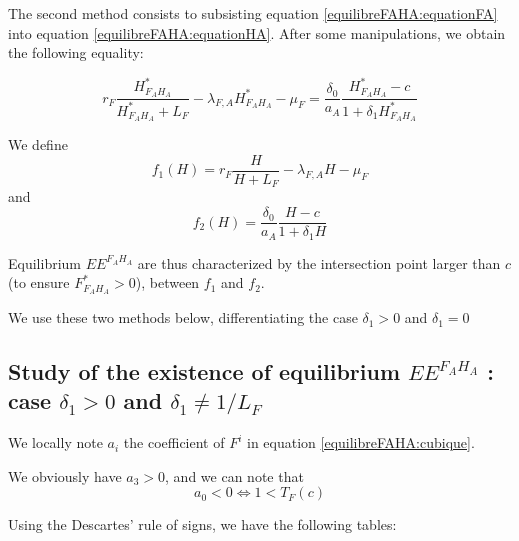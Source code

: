 \documentclass{article}
\newcommand{\lfa}{\lambda_{F, A}}
\begin{document}
\begin{appendices}
\medskip
The second method consists to subsisting equation \eqref{equilibreFAHA:equationFA} into equation \eqref{equilibreFAHA:equationHA}. After some manipulations, we obtain the following equality:

\begin{equation}
r_F \dfrac{H^*_{F_AH_A}}{H^*_{F_AH_A} + L_F} - \lfa H^*_{F_AH_A} - \mu_F = \dfrac{\delta_0}{a_A} \dfrac{H^*_{F_AH_A} - c}{1 + \delta_1 H^*_{F_AH_A}}
\label{equilibreFAHA:fonction}
\end{equation}

We define
\begin{equation*}
f_1(H) = r_F \dfrac{H}{H + L_F} - \lfa H - \mu_F
\end{equation*}
and 
\begin{equation*}
f_2(H) = \dfrac{\delta_0}{a_A} \dfrac{H - c}{1 + \delta_1 H}
\end{equation*}

Equilibrium $EE^{F_AH_A}$ are thus characterized by the intersection point larger than $c$ (to ensure $F^*_{F_AH_A} > 0$), between $f_1$ and $f_2$.

We use these two methods below, differentiating the case $\delta_1 > 0$ and $\delta_1 = 0$

\newpage
\subsection{Study of the existence of equilibrium $EE^{F_AH_A}$ : case $\delta_1 > 0$ and $\delta_1 \neq 1/L_F$}
We locally note $a_i$ the coefficient of $F^i$ in equation \eqref{equilibreFAHA:cubique}.

We obviously have $a_3 > 0$, and we can note that 
\begin{equation*}
a_0 < 0 \Leftrightarrow 1 < T_F(c)
\end{equation*}

Using the Descartes' rule of signs, we have the following tables:


\end{appendices}
\end{document}
